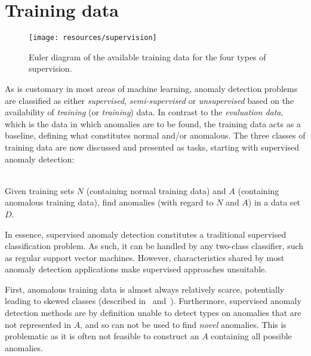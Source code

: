 \clearpage

\section{Training data}
\label{sect:training_data}

\begin{wrapfigure}{r}{0.5\textwidth}
    \vspace{-25pt}
    \begin{center}
        \leavevmode
        \texttt{[image: resources/supervision]}
    \end{center}
    \caption{{\small Euler diagram of the available training data for the four types of supervision.}}
\label{fig:supervision}
    \vspace{-40pt}
\end{wrapfigure}

As is customary in most areas of machine learning, anomaly detection problems are classified as either \emph{supervised}, \emph{semi-supervised} or \emph{unsupervised} based on the availability of \emph{training} (or \emph{training}) data. In contrast to the \emph{evaluation data}, which is the data in which anomalies are to be found, the training data acts as a baseline, defining what constitutes normal and/or anomalous. The three classes of training data are now discussed and presented as tasks, starting with supervised anomaly detection:

\begin{task}
\label{task:supervised}\ \\
    Given training sets $N$ (containing normal training data) and $A$ (containing anomalous training data), find anomalies (with regard to $N$ and $A$) in a data set $D$.
\end{task}
In essence, supervised anomaly detection constitutes a traditional supervised classification problem. As such, it can be handled by any two-class classifier, such as regular support vector machines. However, characteristics shared by most anomaly detection applications make supervised approaches unsuitable.

First, anomalous training data is almost always relatively scarce, potentially leading to skewed classes (described in~\cite{phua} and~\cite{joshi}). Furthermore, supervised anomaly detection methods are by definition unable to detect types on anomalies that are not represented in $A$, and so can not be used to find \emph{novel} anomalies. This is problematic as it is often not feasible to construct an $A$ containing all possible anomalies.

